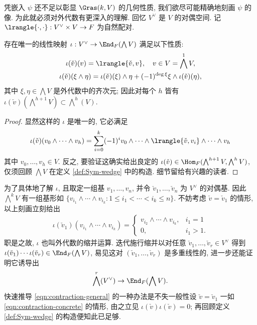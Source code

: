 凭嵌入 $\psi$ 还不足以彰显 $\Gras(k, V)$ 的几何性质, 我们欲尽可能精确地刻画 $\psi$ 的像. 为此就必须对外代数有更深入的理解. 回忆 $V^\vee$ 是 $V$ 的对偶空间. 记 $\lrangle{\cdot, \cdot}: V^\vee \times V \to F$ 为自然配对.
\begin{definition-theorem}\label{def:wedge-contraction}
	存在唯一的线性映射 $\iota: V^\vee \to \End_F( \bigwedge V)$ 满足以下性质:
	\begin{gather*}
		\iota(\check{v})(v) = \lrangle{\check{v}, v}, \quad v \in V = \bigwedge^1 V, \\
		\iota(\check{v})(\xi \wedge \eta) = \iota(\check{v})(\xi) \wedge \eta + (-1)^{\deg \xi} \xi \wedge \iota(\check{v})(\eta),
	\end{gather*}
	其中 $\xi, \eta \in \bigwedge V$ 是外代数中的齐次元; 因此对每个 $h$ 皆有 $\iota(\check{v})(\bigwedge^{h+1} V) \subset \bigwedge^h(V)$.
\end{definition-theorem}
\begin{proof}
	显然这样的 $\iota$ 是唯一的, 它必满足
	\[ \iota(\check{v})(v_0 \wedge \cdots \wedge v_h) = \sum_{i=0}^k (-1)^i v_0 \wedge \cdots \wedge \lrangle{\check{v}, v_i} \wedge \cdots \wedge v_h \]
	其中 $v_0, \ldots, v_h \in V$. 反之, 要验证这确实给出良定的 $\iota(\check{v}) \in \Hom_F( \bigwedge^{h+1} V, \bigwedge^h V)$, 仅须回顾 $\bigwedge V$ 在定义 \ref{def:Sym-wedge} 中的构造. 细节留给有兴趣的读者.
\end{proof}
为了具体地了解 $\iota$, 且取定一组基 $v_1, \ldots, v_n$, 并令 $\check{v}_1, \ldots, \check{v}_n$ 为 $V^\vee$ 的对偶基. 因此 $\bigwedge^k V$ 有一组基形如 $\{ v_{i_1} \wedge \cdots \wedge v_{i_k}: 1 \leq i_1 < \cdots < i_k \leq n \}$. 不妨考虑 $\check{v} = \check{v}_1$ 的情形, 以上刻画立刻给出
\begin{gather}\label{eqn:contraction-concrete}
	\iota(\check{v}_1)(v_{i_1} \wedge \cdots \wedge v_{i_k}) = \begin{cases}
		v_{i_2} \wedge \cdots \wedge v_{i_k}, & i_1 = 1 \\
		0, & i_1 > 1. 
\end{cases}\end{gather}
职是之故, $\iota$ 也叫外代数的缩并运算. 迭代施行缩并以对任意 $\check{v}_1, \ldots, \check{v}_r \in V^\vee$ 得到 $\iota(\check{v}_1) \cdots \iota(\check{v}_r) \in \End_F(\bigwedge V)$, 易见这对 $(\check{v}_1, \ldots, \check{v}_r)$ 是多重线性的, 进一步还能证明它诱导出
\begin{equation}\label{eqn:contraction-general}
	\bigwedge^r(V^\vee) \to \End_F(\bigwedge V).
\end{equation}	
快速推导 \eqref{eqn:contraction-general} 的一种办法是不失一般性设 $\check{v} = \check{v}_1$ 一如 \eqref{eqn:contraction-concrete} 的情形, 由之立见 $\iota(\check{v}) \iota(\check{v})=0$; 再回顾定义 \ref{def:Sym-wedge} 的构造便知此已足够.

